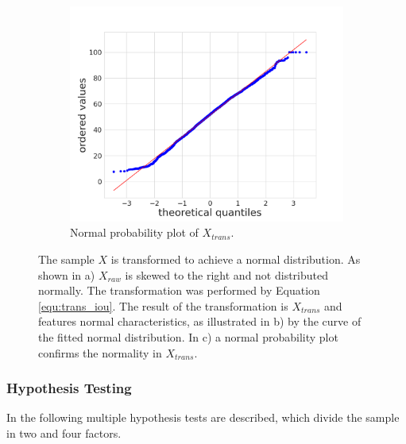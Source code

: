 \begin{figure} [h]
\begin{subfigure}[t]{0.3\textwidth}
{		} \label{fig:ch5:sec1:data_transformed}
	\end{subfigure}
	\hfill
	\begin{subfigure}[t]{0.3\textwidth}
		\centering
		\includegraphics[width=\textwidth]{figures/chap51_iou_probplot.png}
		\caption{
			Normal probability plot of $ X_{trans} $.
		}\label{fig:ch5:sec1:probplot}
	\end{subfigure}
	\caption[Sample Transformation $ IoU $]{		
		The sample $ X $ is transformed to achieve a normal distribution.
		As shown in a) $ X_{raw} $ is skewed to the right and not distributed normally.
		The transformation was performed by Equation \ref{equ:trans_iou}.
		The result of the transformation is $ X_{trans} $ and features normal characteristics, as illustrated in b) by the curve of the fitted normal distribution.
		In c) a normal probability plot confirms the normality in $ X_{trans} $.
	}\label{fig:ch5:sec1:data_transformation_iou}
\end{figure}


\subsubsection{Hypothesis Testing}

In the following multiple hypothesis tests are described, which divide the sample in two and four factors.

